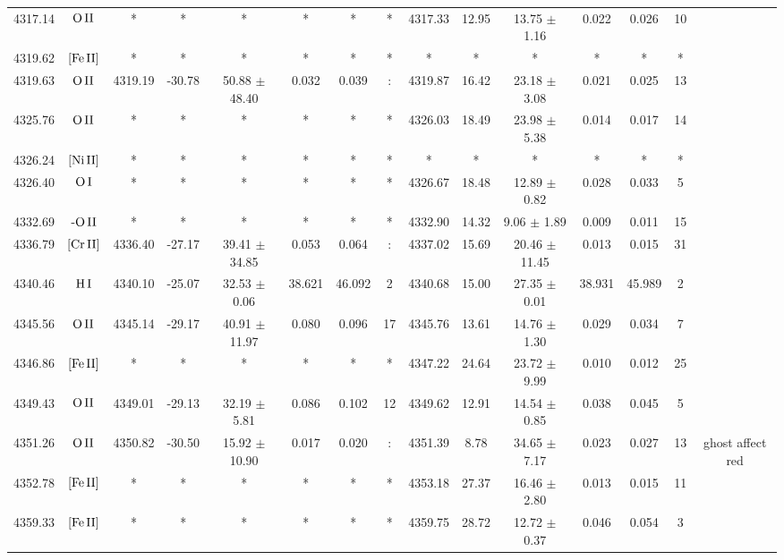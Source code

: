 \documentclass{article}
\begin{document}
\begin{table*}
\begin{adjustbox}{width=\textwidth}
\begin{tabular}{ccccccccccccccc}
4317.14 & $\mbox{O}\thinspace \mbox{II}$ & * & * & * & * & * & * & 4317.33 & 12.95 & 13.75 $\pm$ 1.16 & 0.022 & 0.026 & 10 &  \\
4319.62 & $\mbox{[Fe}\thinspace \mbox{II]}$ & * & * & * & * & * & * & * & * & * & * & * & * &  \\
4319.63 & $\mbox{O}\thinspace \mbox{II}$ & 4319.19 & -30.78 & 50.88 $\pm$ 48.40 & 0.032 & 0.039 & : & 4319.87 & 16.42 & 23.18 $\pm$ 3.08 & 0.021 & 0.025 & 13 &  \\
4325.76 & $\mbox{O}\thinspace \mbox{II}$ & * & * & * & * & * & * & 4326.03 & 18.49 & 23.98 $\pm$ 5.38 & 0.014 & 0.017 & 14 &  \\
4326.24 & $\mbox{[Ni}\thinspace \mbox{II]}$ & * & * & * & * & * & * & * & * & * & * & * & * &  \\
4326.40 & $\mbox{O}\thinspace \mbox{I}$ & * & * & * & * & * & * & 4326.67 & 18.48 & 12.89 $\pm$ 0.82 & 0.028 & 0.033 & 5 &  \\
4332.69 & $\mbox{-O}\thinspace \mbox{II}$ & * & * & * & * & * & * & 4332.90 & 14.32 & 9.06 $\pm$ 1.89 & 0.009 & 0.011 & 15 &  \\
4336.79 & $\mbox{[Cr}\thinspace \mbox{II]}$ & 4336.40 & -27.17 & 39.41 $\pm$ 34.85 & 0.053 & 0.064 & : & 4337.02 & 15.69 & 20.46 $\pm$ 11.45 & 0.013 & 0.015 & 31 &  \\
4340.46 & $\mbox{H}\thinspace \mbox{I}$ & 4340.10 & -25.07 & 32.53 $\pm$ 0.06 & 38.621 & 46.092 & 2 & 4340.68 & 15.00 & 27.35 $\pm$ 0.01 & 38.931 & 45.989 & 2 &  \\
4345.56 & $\mbox{O}\thinspace \mbox{II}$ & 4345.14 & -29.17 & 40.91 $\pm$ 11.97 & 0.080 & 0.096 & 17 & 4345.76 & 13.61 & 14.76 $\pm$ 1.30 & 0.029 & 0.034 & 7 &  \\
4346.86 & $\mbox{[Fe}\thinspace \mbox{II]}$ & * & * & * & * & * & * & 4347.22 & 24.64 & 23.72 $\pm$ 9.99 & 0.010 & 0.012 & 25 &  \\
4349.43 & $\mbox{O}\thinspace \mbox{II}$ & 4349.01 & -29.13 & 32.19 $\pm$ 5.81 & 0.086 & 0.102 & 12 & 4349.62 & 12.91 & 14.54 $\pm$ 0.85 & 0.038 & 0.045 & 5 &  \\
4351.26 & $\mbox{O}\thinspace \mbox{II}$ & 4350.82 & -30.50 & 15.92 $\pm$ 10.90 & 0.017 & 0.020 & : & 4351.39 & 8.78 & 34.65 $\pm$ 7.17 & 0.023 & 0.027 & 13 &  ghost affect red \\
4352.78 & $\mbox{[Fe}\thinspace \mbox{II]}$ & * & * & * & * & * & * & 4353.18 & 27.37 & 16.46 $\pm$ 2.80 & 0.013 & 0.015 & 11 &  \\
4359.33 & $\mbox{[Fe}\thinspace \mbox{II]}$ & * & * & * & * & * & * & 4359.75 & 28.72 & 12.72 $\pm$ 0.37 & 0.046 & 0.054 & 3 &  \\

\end{tabular}
\end{adjustbox}
\end{table*}
\end{document}
